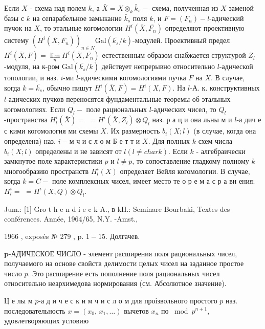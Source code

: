 \documentclass[10pt]{article}
\begin{document}
Если $X$ - схема над полем $k$, а $\bar{X}=X \otimes_{k} \bar{k}_{s}-$ схема, полученная из $X$ заменой базы с $k$ на сепарабельное замыкание $\bar{k}_{s}$ поля $k$, и $F=\left(F_{n}\right)-l$-адический пучок на $X$, то этальные когомологии $H^{i}\left(\bar{X}, \overline{F_{n}}\right)$ определяют проективную систему $\left(H^{i}\left(\bar{X}, \overline{F_{n}}\right)\right)_{n \in N} \mathrm{Gal}\left(\overline{k_{s}} / k\right)$-модулей. Проективный предел $H^{i}(\bar{X}, F)=\underset{n}{\lim } H^{i}\left(\bar{X}, \overline{F_{n}}\right)$ естественным образом снабжается структурой $Z_{l}$-модуля, на к-ром $\mathrm{Gal}\left(\overline{k_{s}} / k\right)$ действует непрерывно относительно $l$-адической топологии, и наз. $i$-ми $l$-адическими когомологиями пучка $F$ на $X$. В случае, когда $k=\overline{k_{s}}$, обычно пишут $H^{i}(\bar{X}, F)=H^{i}(X, F)$. На $l$-А. к. конструктивных $l$-адических пучков переносятся фундаментальные теоремы об этальных когомологиях. Если $Q_{l}-$ поле рациональных $l$-адических чисел, то $Q_{l}$-пространства $H_{l}^{i}(\bar{X})=$ $=H^{i}\left(\bar{X}, Z_{l}\right) \otimes Q_{l}$ наз. р а ц и она льны м и $l$-а дич е с кими когомология ми схемы $X$. Их размерность $b_{i}(X ; l)$ (в случае, когда она определена) наз. $i-\mathbf{м}$ ч и с л о м Б е т т и $X$. Для полных $k$-схем числа $b_{i}(X ; l)$ определены и не зависят от $l(l \neq c h a r k)$. Если $k$ - алгебраически замкнутое поле характеристики $p$ и $l \neq p$, то сопоставление гладкому полному $k$ многообразию пространств $H_{l}^{i}(X)$ определяет Вейля когомологии. В случае, когда $k=C-$ поле комплексных чисел, имеет место те о р е м а с р а вн ения: $H_{l}^{i}=$ $=H^{i}(X, Q) \otimes Q_{l}$.



Jum.: [1] Gro $\mathrm{t}$ h e n d i e c $\mathrm{k}$ A., в kH.: Seminare Bourbaki, Textes des conférences. Année, 1964/65, N.Y. -Amst.,

1966 , exposés № 279 , p. $1-15$. Долгачев.



$\boldsymbol{p}$-АДИЧЕСКОЕ ЧИСЛО - элемент расширения поля рациональных чисел, получаемого на основе свойств делимости целых чисел на заданное простое число $p$. Это расширение есть пополнение поля рациональных чисел относительно неархимедова нормирования (см. Абсолютное значение).



Ц е лы м $p$-а д и ч е с к и м ч и с л о м для проізвольного простого $p$ наз. последовательность $x=\left(x_{0}\right.$, $\left.x_{1}, \ldots\right)$ вычетов $x_{n}$ по $\bmod p^{n+1}$, удовлетворяющих условию
\end{document}
